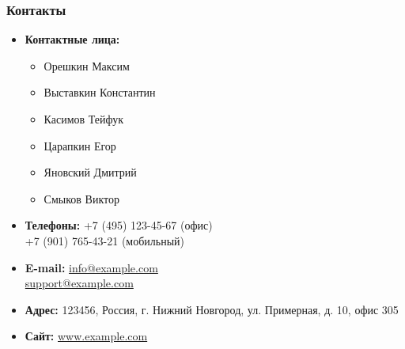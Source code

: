 \documentclass[a4paper,12pt]{article}
\begin{document}
\subsubsection{Контакты}
\begin{itemize}[label=$\ast$, leftmargin=2cm]
    \item \textbf{Контактные лица:}  
    \begin{itemize}[label=\textbullet, leftmargin=1cm]
        \item Орешкин Максим
        \item Выставкин Константин
        \item Касимов Тейфук
        \item Царапкин Егор
        \item Яновский Дмитрий
        \item Смыков Виктор
    \end{itemize}
   

    \item \textbf{Телефоны:}  
    +7 (495) 123-45-67 (офис) \\ 
    +7 (901) 765-43-21 (мобильный) 

    \item \textbf{E-mail:}  
    \href{mailto:info@example.com}{info@example.com} \\
    \href{mailto:support@example.com}{support@example.com}

    \item \textbf{Адрес:}  
    123456, Россия, г. Нижний Новгород, ул. Примерная, д. 10, офис 305

    \item \textbf{Сайт:}  
    \href{http://www.example.com}{www.example.com}
\end{itemize}
\end{document}
